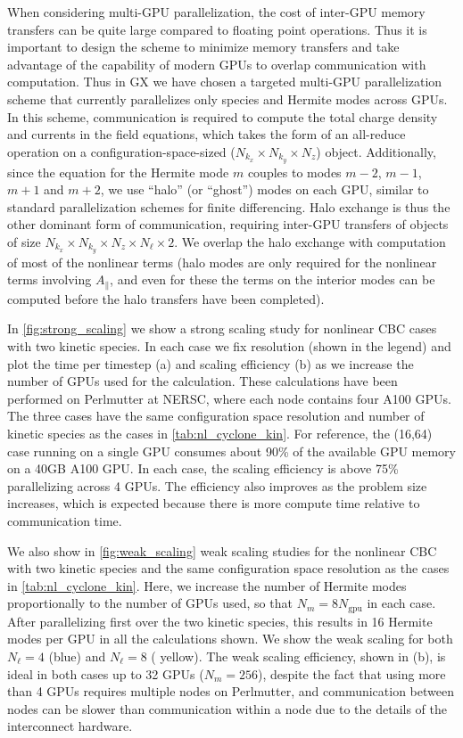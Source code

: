 \documentclass{jpp}
\newcommand{\GX}{{GX}\xspace}
\begin{document}
When considering multi-GPU parallelization, the cost of inter-GPU memory transfers can be quite large compared to floating point operations. Thus it is important to design the scheme to minimize memory transfers and take advantage of the capability of modern GPUs to overlap communication with computation. Thus in \GX we have chosen a targeted multi-GPU parallelization scheme that currently parallelizes only species and Hermite modes across GPUs. In this scheme, communication is required to compute the total charge density and currents in the field equations, which takes the form of an all-reduce operation on a configuration-space-sized ($N_{k_x}\times N_{k_y}\times N_z$) object. Additionally, since the equation for the Hermite mode $m$ couples to modes $m-2$, $m-1$, $m+1$ and $m+2$, we use ``halo'' (or ``ghost'') modes on each GPU, similar to standard parallelization schemes for finite differencing. Halo exchange is thus the other dominant form of communication, requiring inter-GPU transfers of objects of size $N_{k_x}\times N_{k_y}\times N_z\times N_\ell\times 2$. We overlap the halo exchange with computation of most of the nonlinear terms (halo modes are only required for the nonlinear terms involving $A_\parallel$, and even for these the terms on the interior modes can be computed before the halo transfers have been completed). 

In \cref{fig:strong_scaling} we show a strong scaling study for nonlinear CBC cases with {\color{black} two} kinetic species. In each case we fix resolution (shown in the legend) and plot the time per timestep (a) and scaling efficiency (b) as we increase the number of GPUs used for the calculation. These calculations have been performed on Perlmutter at NERSC, where each node contains four A100 GPUs. The three cases have the same configuration space resolution and number of kinetic species as the cases in \cref{tab:nl_cyclone_kin}. {\color{black} For reference, the (16,64) case running on a single GPU consumes about 90\% of the available GPU memory on a 40GB A100 GPU. In each case, the scaling efficiency is above 75\% parallelizing across 4 GPUs. The efficiency also improves as the problem size increases, which is expected because there is more compute time relative to communication time.}

We also show in \cref{fig:weak_scaling} weak scaling studies for the nonlinear CBC with two kinetic species and the same configuration space resolution as the cases in \cref{tab:nl_cyclone_kin}. Here, we increase the number of Hermite modes proportionally to the number of GPUs used, so that $ N_m=8 N_\mathrm{gpu}$ in each case. After parallelizing first over the two kinetic species, this results in 16 Hermite modes per GPU in all the calculations shown. We show the weak scaling for both $ N_\ell=4$ (blue) and $ N_\ell=8$ ({\color{black} yellow}). The weak scaling efficiency, shown in (b), is ideal {\color{black} in both cases up to 32 GPUs ($N_m = 256$), despite the fact that using more than 4 GPUs requires multiple nodes on Perlmutter, and communication between nodes can be slower than communication within a node due to the details of the interconnect hardware.  
}
\end{document}
